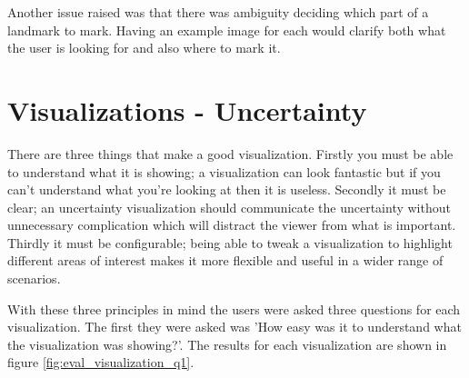 Another issue raised was that there was ambiguity deciding which part of a landmark to mark. Having an example image for each would clarify both what the user is looking for and also where to mark it.

\newpage
\section{Visualizations - Uncertainty}
There are three things that make a good visualization. Firstly you must be able to understand what it is showing; a visualization can look fantastic but if you can't understand what you're looking at then it is useless. Secondly it must be clear; an uncertainty visualization should communicate the uncertainty without unnecessary complication which will distract the viewer from what is important. Thirdly it must be configurable; being able to tweak a visualization to highlight different areas of interest makes it more flexible and useful in a wider range of scenarios.

With these three principles in mind the users were asked three questions for each visualization. The first they were asked was 'How easy was it to understand what the visualization was showing?'. The results for each visualization are shown in figure \ref{fig:eval_visualization_q1}.

